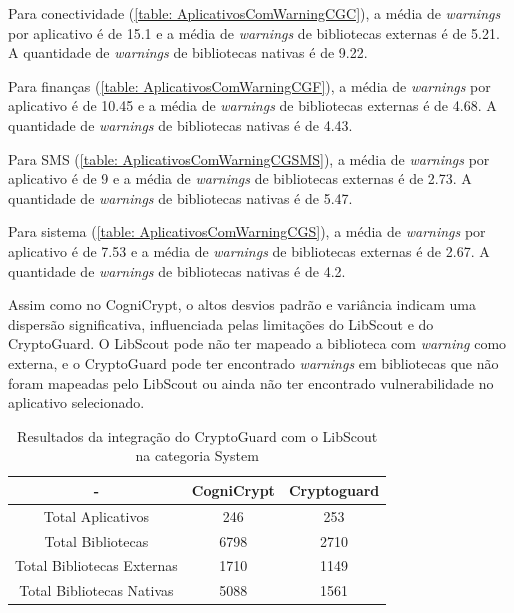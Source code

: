 Para conectividade (\ref{table: AplicativosComWarningCGC}), a média de \textit{warnings} por aplicativo é de \num{15.1} e a média de \textit{warnings} de bibliotecas externas é de \num{5.21}. A quantidade de \textit{warnings} de bibliotecas nativas é de \num{9.22}. 

Para finanças (\ref{table: AplicativosComWarningCGF}), a média de \textit{warnings} por aplicativo é de \num{10.45} e a média de \textit{warnings} de bibliotecas externas é de \num{4.68}. A quantidade de \textit{warnings} de bibliotecas nativas é de \num{4.43}.

Para SMS (\ref{table: AplicativosComWarningCGSMS}), a média de \textit{warnings} por aplicativo é de \num{9} e a média de \textit{warnings} de bibliotecas externas é de \num{2.73}. A quantidade de \textit{warnings} de bibliotecas nativas é de \num{5.47}.

Para sistema (\ref{table: AplicativosComWarningCGS}), a média de \textit{warnings} por aplicativo é de \num{7.53} e a média de \textit{warnings} de bibliotecas externas é de \num{2.67}. A quantidade de \textit{warnings} de bibliotecas nativas é de \num{4.2}. 

Assim como no CogniCrypt, o altos desvios padrão e variância indicam uma dispersão significativa, influenciada pelas limitações do LibScout e do CryptoGuard. O LibScout pode não ter mapeado a biblioteca com \textit{warning} como externa, e o CryptoGuard pode ter encontrado \textit{warnings} em bibliotecas que não foram mapeadas pelo LibScout ou ainda não ter encontrado vulnerabilidade no aplicativo selecionado.

\begin{table}[!htbp]
  \centering
  \small
  \begin{tabular}{|c|c|c|}
    \hline
    \textbf{-} & \textbf{CogniCrypt} & \textbf{Cryptoguard} \\
    \hline
    Total Aplicativos & \num{246} & \num{253} \\
    Total Bibliotecas & \num{6798} & \num{2710}  \\
    Total Bibliotecas Externas & \num{1710} & \num{1149} \\
    Total Bibliotecas Nativas & \num{5088} & \num{1561} \\
    \hline
  \end{tabular}
  \caption{Resultados da integração do CryptoGuard com o LibScout na categoria System}
  \label{table: AplicativosComWarningSummary}
\end{table}


